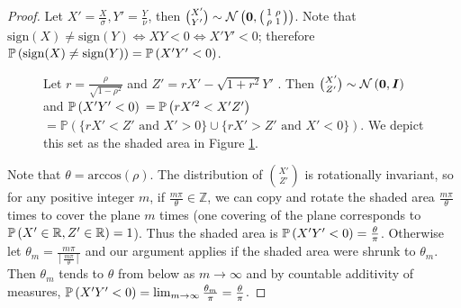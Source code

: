 \begin{proof}
 Let $X' = \frac{X}{\sigma}, Y' = \frac{Y}{\nu}$, then $\binom{X'}{Y'} \sim \mathcal{N}\left( \bm{0}, \begin{psmallmatrix} 1 & \rho \\ \rho & 1 \end{psmallmatrix} \right)$. Note that $\text{sign}(X) \neq \text{sign}(Y) \iff XY < 0 \iff X'Y' < 0$; therefore $\prob{\text{sign}(X) \neq \text{sign}(Y) } = \prob{X'Y' < 0}$. 

\begin{figure}[H]
    \begin{minipage}[T]{0.48\columnwidth}
        \raggedright
        Let $r = \frac{\rho}{\sqrt{1-\rho^2}}$ and $Z' = rX' - \sqrt{1+r^{2}} Y'$ . 
        Then $\binom{X'}{Z'} \sim \mathcal{N}\left(\bm{0}, \bm{I}\right)$ and 
        $\prob{X'Y'<0}$
        \noindent$ = \prob{rX'^{2} < X'Z'} $ 
        \noindent$= 
        \mathbb{P}(\{rX' < Z' \text{ and } X' > 0\} \cup \{rX' > Z' \text{ and } X' < 0 \})$. 
        We depict this set as the shaded area in Figure \ref{fig:proof_fig}.
    \end{minipage}
    \hfill
    \begin{minipage}[T]{0.48\columnwidth}
        \centering
        
        \label{fig:proof_fig}
    \end{minipage}
\end{figure}

Note that $\theta = \text{arccos}(\rho)$. The distribution of $\binom{X'}{Z'}$ is rotationally invariant, so for any positive integer $m$, if $\frac{m\pi}{\theta} \in \mathbb{Z}$, we can copy and rotate the shaded area $\frac{m\pi}{\theta}$ times to cover the plane $m$ times (one covering of the plane corresponds to $\prob{X' \in \mathbb{R}, Z' \in \mathbb{R}} = 1$). Thus the shaded area is $\prob{X'Y'<0} = \frac{\theta}{\pi}$. Otherwise let $\theta_{m} = \frac{m\pi}{\left\lceil\frac{m\pi}{\theta} \right\rceil}$ and our argument applies if the shaded area were shrunk to $\theta_{m}$. Then $\theta_{m}$ tends to $\theta$ from below as $m \to \infty$ and by countable additivity of measures, $\prob{X'Y' < 0} = \lim_{m\to\infty} \frac{\theta_{m}}{\pi} = \frac{\theta}{\pi}$.
\end{proof}

